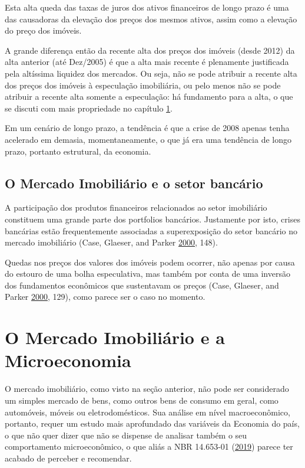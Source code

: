 \documentclass[
	12pt,				%
	oneside,			%
	a4paper,			%
	chapter=TITLE,		%
	section=TITLE,		%
	english,			%
	brazil				%
	]{abntex2}
\begin{document}
Esta alta queda das taxas de juros dos ativos financeiros de longo prazo é uma
das causadoras da elevação dos preços dos mesmos ativos, assim como a elevação
do preço dos imóveis.

A grande diferença então da recente alta dos preços dos imóveis (desde 2012) da
alta anterior (até Dez/2005) é que a alta mais recente é plenamente justificada
pela altíssima liquidez dos mercados. Ou seja, não se pode atribuir a recente
alta dos preços dos imóveis à especulação imobiliária, ou pelo menos não se pode
atribuir a recente alta somente a especulação: há fundamento para a alta, o que
se discuti com mais propriedade no capítulo \ref{micro}.

Em um cenário de longo prazo, a tendência é que a crise de 2008 apenas tenha
acelerado em demasia, momentaneamente, o que já era uma tendência de longo
prazo, portanto estrutural, da economia.

\hypertarget{MI-e-o-setor-bancario}{%
\subsection{O Mercado Imobiliário e o setor bancário}\label{MI-e-o-setor-bancario}}

A participação dos produtos financeiros relacionados ao setor imobiliário
constituem uma grande parte dos portfolios bancários. Justamente por isto,
crises bancárias estão frequentemente associadas a superexposição do setor
bancário no mercado imobiliário (Case, Glaeser, and Parker \protect\hyperlink{ref-Case2000}{2000}, 148).

Quedas nos preços dos valores dos imóveis podem ocorrer, não apenas por causa
do estouro de uma bolha especulativa, mas também por conta de uma inversão dos
fundamentos econômicos que sustentavam os preços (Case, Glaeser, and Parker \protect\hyperlink{ref-Case2000}{2000}, 129), como parece
ser o caso no momento.

\hypertarget{micro}{%
\section{O Mercado Imobiliário e a Microeconomia}\label{micro}}

O mercado imobiliário, como visto na seção anterior, não pode ser
considerado um simples mercado de bens, como outros bens de consumo em geral,
como automóveis, móveis ou eletrodomésticos. Sua análise em nível macroeconômico,
portanto, requer um estudo mais aprofundado das variáveis da Economia do país,
o que não quer dizer que não se dispense de analisar também o seu comportamento
microeconômico, o que aliás a NBR 14.653-01 (\protect\hyperlink{ref-NBR1465301}{2019}) parece ter acabado de
perceber e recomendar.
\end{document}
